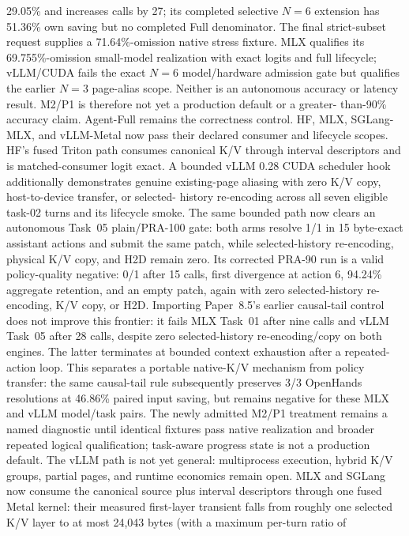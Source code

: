\documentclass[11pt]{article}
\begin{document}
29.05\% and increases calls by 27; its completed selective $N=6$ extension has
51.36\% own saving but no completed Full denominator.  The final strict-subset
request supplies a 71.64\%-omission native stress fixture.  MLX qualifies its
69.755\%-omission small-model realization with exact logits and full lifecycle;
vLLM/CUDA fails the exact $N=6$ model/hardware admission gate but qualifies the
earlier $N=3$ page-alias scope.  Neither is an autonomous accuracy or latency
result.  M2/P1 is therefore not yet a production default or a greater-
than-90\% accuracy claim.  Agent-Full remains the correctness control.  HF,
MLX, SGLang-MLX, and vLLM-Metal now pass their declared
consumer and lifecycle scopes.  HF's fused Triton path consumes canonical K/V
through interval descriptors and is matched-consumer logit exact.  A bounded
vLLM 0.28 CUDA scheduler hook additionally demonstrates genuine
existing-page aliasing with zero K/V copy, host-to-device transfer, or selected-
history re-encoding across all seven eligible task-02 turns and its lifecycle
smoke.  The same bounded path now clears an autonomous Task~05 plain/PRA-100
gate: both arms resolve 1/1 in 15 byte-exact assistant actions and submit the
same patch, while selected-history re-encoding, physical K/V copy, and H2D
remain zero.  Its corrected PRA-90 run is a valid policy-quality negative:
0/1 after 15 calls, first divergence at action 6, 94.24\% aggregate retention,
and an empty patch, again with zero selected-history re-encoding, K/V copy, or
H2D.  Importing Paper~8.5's earlier causal-tail control does not improve this frontier:
it fails MLX Task~01 after nine calls and vLLM Task~05 after 28 calls, despite
zero selected-history re-encoding/copy on both engines.  The latter terminates
at bounded context exhaustion after a repeated-action loop.  This separates a
portable native-K/V mechanism from policy transfer: the same causal-tail rule
subsequently preserves 3/3 OpenHands resolutions at 46.86\% paired input
saving, but remains negative for these MLX and vLLM model/task pairs.  The
newly admitted M2/P1 treatment remains a named diagnostic until
identical fixtures pass native realization and broader repeated logical
qualification; task-aware progress state is not a production default.  The vLLM path
is not yet general: multiprocess execution, hybrid K/V
groups, partial pages, and runtime economics remain open.
MLX and SGLang
now consume the canonical source plus interval descriptors through one fused
Metal kernel: their measured first-layer transient falls from roughly one
selected K/V layer to at most 24,043 bytes (with a maximum per-turn ratio of
\end{document}
